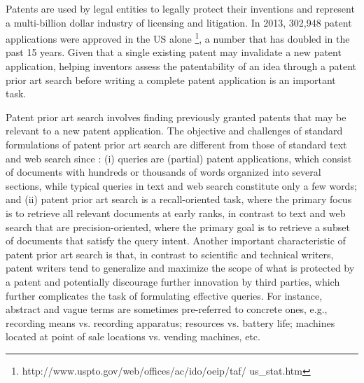 Patents are used by legal entities to legally protect their
inventions and represent a multi-billion dollar industry of licensing
and litigation. In 2013, 302,948 patent applications were approved
in the US alone%
\footnote{http://www.uspto.gov/web/offices/ac/ido/oeip/taf/ us\_stat.htm%
}, a number that has doubled in the past 15 years. Given that a single
existing patent may invalidate a new patent application, helping inventors
assess the patentability of an idea through a patent prior art search
before writing a complete patent application is an important task.

Patent prior art search involves finding previously granted patents
that may be relevant to a new patent application. The objective and
challenges of standard formulations of patent prior art search are
different from those of standard text and web search since \cite{Magdy2012}:
(i) queries are (partial) patent applications, which consist of documents
with hundreds or thousands of words organized into several sections,
while typical queries in text and web search constitute only a few
words; and (ii) patent prior art search is a recall-oriented task,
where the primary focus is to retrieve all relevant documents at early
ranks, in contrast to text and web search that are precision-oriented,
where the primary goal is to retrieve a subset of documents that satisfy
the query intent. Another important characteristic of patent prior
art search is that, in contrast to scientific and technical writers,
patent writers tend to generalize and maximize the scope of what is
protected\textcolor{red}{{} }by a patent and potentially discourage
further innovation by third parties, which further complicates the
task of formulating effective queries. For instance, abstract and
vague terms are sometimes pre-referred to concrete ones, e.g., recording
means vs. recording apparatus; resources vs. battery life; machines
located at point of sale locations vs. vending machines, etc.

